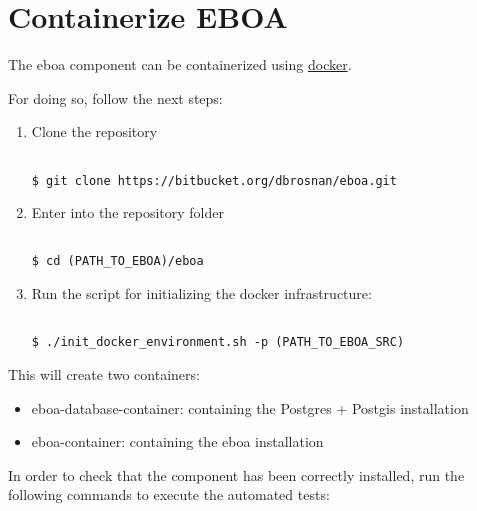 \chapter{Containerize EBOA}

The \acrshort{eboa} component can be containerized using \href{https://www.docker.com/}{docker}.

For doing so, follow the next steps:

\begin{enumerate}

\item Clone the repository

\begin{lstlisting}[breaklines=true, style=bash]

$ git clone https://bitbucket.org/dbrosnan/eboa.git

\end{lstlisting}

\item Enter into the repository folder

\begin{lstlisting}[breaklines=true, style=bash]

$ cd (PATH_TO_EBOA)/eboa

\end{lstlisting}

\item Run the script for initializing the docker infrastructure:

\begin{lstlisting}[breaklines=true, style=bash]

$ ./init_docker_environment.sh -p (PATH_TO_EBOA_SRC)

\end{lstlisting}

\end{enumerate}

This will create two containers:

\begin{itemize}

\item eboa-database-container: containing the Postgres + Postgis installation
\item eboa-container: containing the \acrshort{eboa} installation

\end{itemize}

In order to check that the component has been correctly installed, run the following commands to execute the automated tests:

